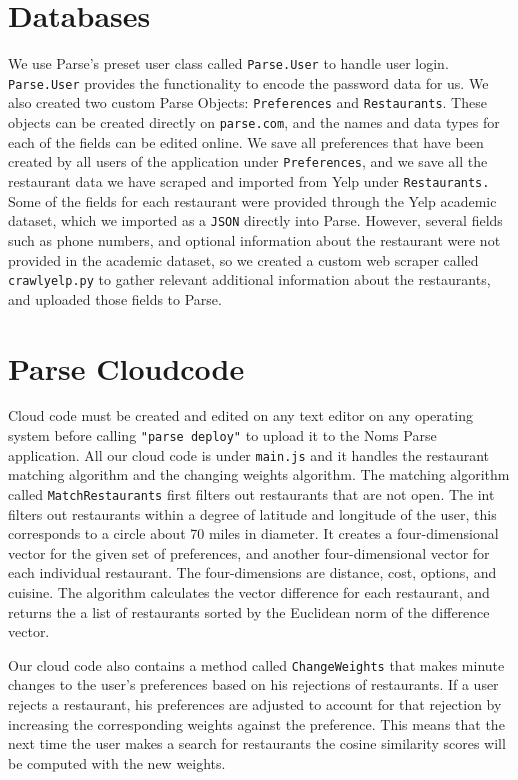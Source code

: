 \documentclass[12pt]{article}
\begin{document}
\section{Databases}
We use Parse's preset user class called \texttt{Parse.User} to handle user login. \texttt{Parse.User} provides the functionality to encode the password data for us.  We also created two custom Parse Objects: \texttt{Preferences} and \texttt{Restaurants}. These objects can be created directly on \texttt{parse.com}, and the names and data types for each of the fields can be edited online.  We save all preferences that have been created by all users of the application under \texttt{Preferences}, and we save all the restaurant data we have scraped and imported from Yelp under \texttt{Restaurants.}
Some of the fields for each restaurant were provided through the Yelp academic dataset, which we imported as a \texttt{JSON} directly into Parse.  However, several fields such as phone numbers, and optional information about the restaurant were not provided in the academic dataset, so we created a custom web scraper called \texttt{crawlyelp.py} to gather relevant additional information about the restaurants, and uploaded those fields to Parse.

\section{Parse Cloudcode}
Cloud code must be created and edited on any text editor on any operating system before calling \texttt{"parse deploy"} to upload it to the Noms Parse application.  All our cloud code is under \texttt{main.js} and it handles the restaurant matching algorithm and the changing weights algorithm. The matching algorithm called \texttt{MatchRestaurants} first filters out restaurants that are not open. The int filters out restaurants within a degree of latitude and longitude of the user, this corresponds to a circle about 70 miles in diameter. It creates a four-dimensional vector for the given set of preferences, and another four-dimensional vector for each individual restaurant.  The four-dimensions are distance, cost, options, and cuisine. The algorithm calculates the vector difference for each restaurant, and returns the a list of restaurants sorted by the Euclidean norm of the difference vector.

Our cloud code also contains a method called \texttt{ChangeWeights} that makes minute changes to the user's preferences based on his rejections of restaurants.  If a user rejects a restaurant, his preferences are adjusted to account for that rejection by increasing the corresponding weights against the preference. This means that the next time the user makes a search for restaurants the cosine similarity scores will be computed with the new weights.
\end{document}
